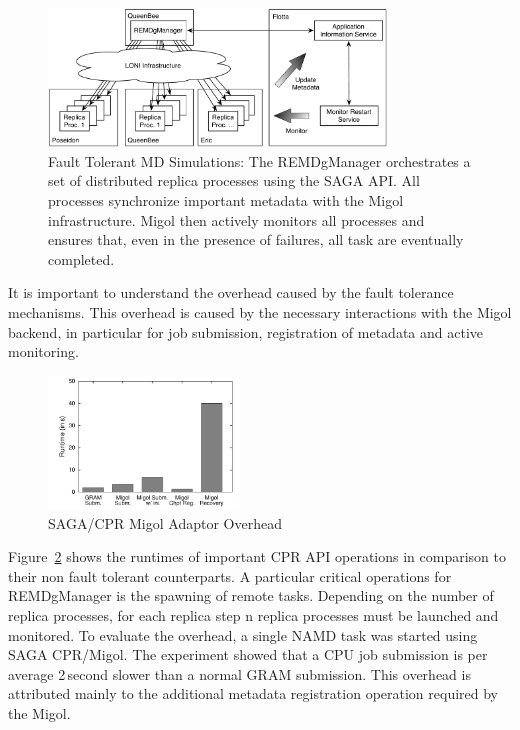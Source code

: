 \documentclass[times, 10pt,twocolumn]{article}
\begin{document}
\begin{figure}[t]
    \centering
        \includegraphics[width=0.8\textwidth]{saga-taskfarming}
        \caption{Fault Tolerant MD Simulations: The
          REMDgManager orchestrates a set of distributed replica
          processes using the SAGA API. All processes synchronize
          important metadata with the Migol infrastructure. Migol then
          actively monitors all processes and ensures that, even in
          the presence of failures, all task are eventually
          completed.}
    \label{fig:saga-taskfarming}
  \end{figure} 

It is important to understand the overhead caused by the fault
tolerance mechanisms. This overhead is caused by the necessary
interactions with the Migol backend, in particular for job submission,
registration of metadata and active monitoring.
\begin{figure}[ht]
    \centering
        \includegraphics[width=0.45\textwidth]{performance/perf_submission.pdf}
    \caption{SAGA/CPR Migol Adaptor Overhead}
    \label{fig:performance_perf_submission}
\end{figure}           
Figure~\ref{fig:performance_perf_submission} shows the runtimes of
important CPR API operations in comparison to their non fault tolerant
counterparts. A particular critical operations for REMDgManager is the
spawning of remote tasks. Depending on the number of replica
processes, for each replica step n replica processes must be launched
and monitored.  To evaluate the overhead, a single NAMD task was
started using SAGA CPR/Migol.  The experiment showed that a CPU job
submission is per average 2\,second slower than a normal GRAM
submission. This overhead is attributed mainly to the additional
metadata registration operation required by the Migol.
\end{document}
